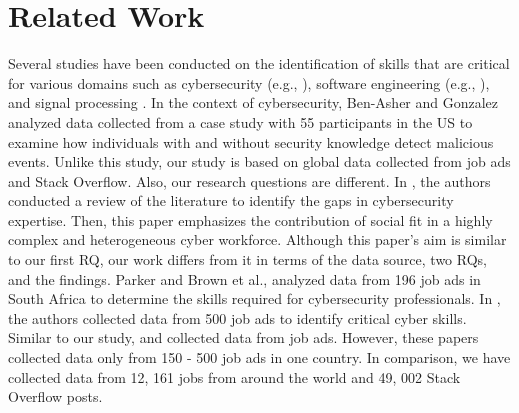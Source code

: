 \section{Related Work}
\label{RW}

Several studies have been conducted on the identification of skills that are critical for various domains such as cybersecurity (e.g., \cite{2,3,5,10,12,15,29,caulkins2019cybersecurity,jerman2022cybersecurity,peslak2019cybersecurity, jain2024comprehensive}), software engineering (e.g., \cite{khaouja2021survey,daneva2019understanding,matturro2019systematic, goel2018overview, goel2021maintenance}), and signal processing \cite{abbas2024robust}. In the context of cybersecurity, Ben-Asher and Gonzalez \cite{2} analyzed data collected from a case study with 55 participants in the US to examine how individuals with and without security knowledge detect malicious events. Unlike this study, our study is based on global data collected from job ads and Stack Overflow. Also, our research questions are different. In \cite{3}, the authors conducted a review of the literature to identify the gaps in cybersecurity expertise. Then, this paper emphasizes the contribution of social fit in a highly complex and heterogeneous cyber workforce. Although this paper's aim is similar to our first RQ, our work differs from it in terms of the data source, two RQs, and the findings. Parker and Brown et al., \cite{10} analyzed data from 196 job ads in South Africa to determine the skills required for cybersecurity professionals. In \cite{peslak2019cybersecurity}, the authors collected data from 500 job ads to identify critical cyber skills. Similar to our study,  \cite{10} and \cite{peslak2019cybersecurity} collected data from job ads. However, these papers collected data only from 150 - 500 job ads in one country. In comparison, we have collected data from 12, 161 jobs from around the world and 49, 002 Stack Overflow posts. 
\smallbreak
